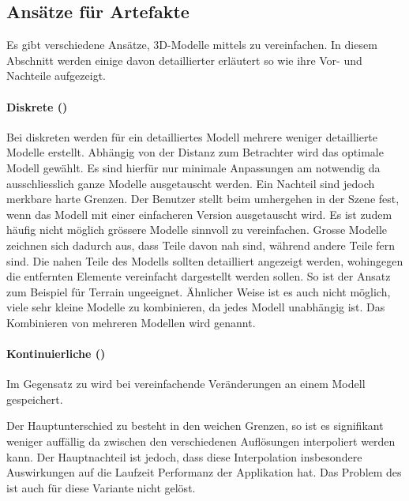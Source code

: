 \subsection{Ansätze für  Artefakte}
\label{chap:differentLodApproaches}
Es gibt verschiedene Ansätze, 3D-Modelle mittels  zu vereinfachen. In diesem Abschnitt werden einige davon detaillierter erläutert so wie ihre Vor- und Nachteile aufgezeigt.

\paragraph{Diskrete  ()}
Bei diskreten  werden für ein detailliertes Modell mehrere weniger detaillierte Modelle erstellt.
Abhängig von der Distanz zum Betrachter wird das optimale Modell gewählt. Es sind hierfür nur minimale Anpassungen am  notwendig da ausschliesslich ganze Modelle ausgetauscht werden.
Ein Nachteil sind jedoch merkbare harte Grenzen. Der Benutzer stellt beim umhergehen in der Szene fest, wenn das Modell mit einer einfacheren Version ausgetauscht wird.
Es ist zudem häufig nicht möglich grössere Modelle sinnvoll zu vereinfachen. Grosse Modelle zeichnen sich dadurch aus, dass Teile davon nah sind, während andere Teile fern sind. Die nahen Teile des Modells sollten detailliert angezeigt werden, wohingegen die entfernten Elemente vereinfacht dargestellt werden sollen. So ist der Ansatz zum Beispiel für Terrain ungeeignet. Ähnlicher Weise ist es auch nicht möglich, viele sehr kleine Modelle zu kombinieren, da jedes Modell unabhängig ist. Das Kombinieren von mehreren Modellen wird  genannt.

\paragraph{Kontinuierliche  ()}
Im Gegensatz zu  wird bei  vereinfachende Veränderungen an einem Modell gespeichert.

Der Hauptunterschied zu  besteht in den weichen Grenzen, so ist es signifikant weniger auffällig da zwischen den verschiedenen Auflösungen interpoliert werden kann.
Der Hauptnachteil ist jedoch, dass diese Interpolation insbesondere Auswirkungen auf die Laufzeit Performanz der Applikation hat.
Das Problem des  ist auch für diese Variante nicht gelöst.

